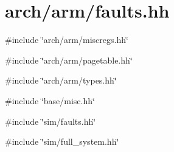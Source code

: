 \hypertarget{arch_2arm_2faults_8hh}{
\section{arch/arm/faults.hh}
\label{arch_2arm_2faults_8hh}
}
{\ttfamily \#include \char`\"{}arch/arm/miscregs.hh\char`\"{}}\par
{\ttfamily \#include \char`\"{}arch/arm/pagetable.hh\char`\"{}}\par
{\ttfamily \#include \char`\"{}arch/arm/types.hh\char`\"{}}\par
{\ttfamily \#include \char`\"{}base/misc.hh\char`\"{}}\par
{\ttfamily \#include \char`\"{}sim/faults.hh\char`\"{}}\par
{\ttfamily \#include \char`\"{}sim/full\_\-system.hh\char`\"{}}\par
